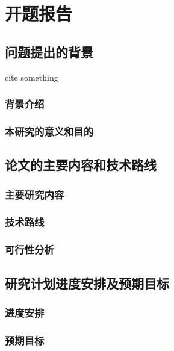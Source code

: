 \chapter{开题报告}

\section{问题提出的背景}
cite something~\cite{article1}
\subsection{背景介绍}

\subsection{本研究的意义和目的}

\section{论文的主要内容和技术路线}

\subsection{主要研究内容}

\subsection{技术路线}

\subsection{可行性分析}

\section{研究计划进度安排及预期目标}

\subsection{进度安排}

\subsection{预期目标}


{
\renewcommand{\bibsection}{\section{\bibname}}

}

